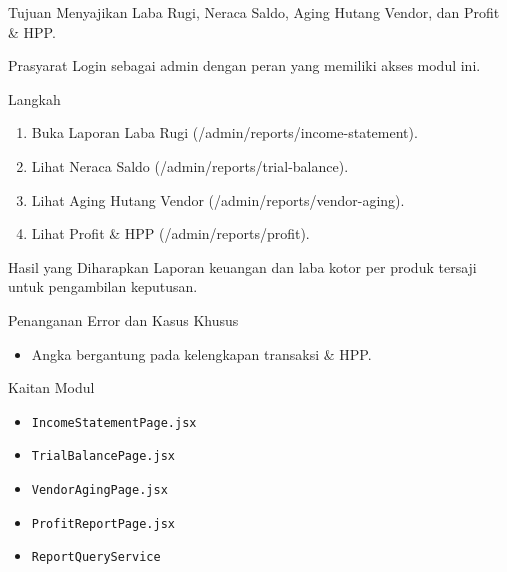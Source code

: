 
\begin{flowsection}{Tujuan}
Menyajikan Laba Rugi, Neraca Saldo, Aging Hutang Vendor, dan Profit \&  HPP.
\end{flowsection}

\begin{flowsection}{Prasyarat}
Login sebagai admin dengan peran yang memiliki akses modul ini.
\end{flowsection}

\begin{flowsection}{Langkah}
\begin{enumerate}
  \item Buka Laporan Laba Rugi (/admin/reports/income-statement).
  \item Lihat Neraca Saldo (/admin/reports/trial-balance).
  \item Lihat Aging Hutang Vendor (/admin/reports/vendor-aging).
  \item Lihat Profit \&  HPP (/admin/reports/profit).
\end{enumerate}
\end{flowsection}


\begin{flowsection}{Hasil yang Diharapkan}
Laporan keuangan dan laba kotor per produk tersaji untuk pengambilan keputusan.
\end{flowsection}

\begin{flowsection}{Penanganan Error dan Kasus Khusus}
\begin{itemize}
  \item Angka bergantung pada kelengkapan transaksi \&  HPP.
\end{itemize}
\end{flowsection}

\begin{flowsection}{Kaitan Modul}
\begin{itemize}
  \item \texttt{IncomeStatementPage.jsx}
  \item \texttt{TrialBalancePage.jsx}
  \item \texttt{VendorAgingPage.jsx}
  \item \texttt{ProfitReportPage.jsx}
  \item \texttt{ReportQueryService}
\end{itemize}
\end{flowsection}

